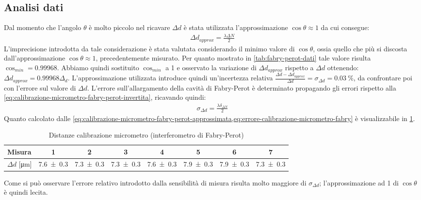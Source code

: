 \documentclass[a4paper]{article}
\begin{document}
\subsection{Analisi dati}
Dal momento che l'angolo $\theta$ è molto piccolo nel ricavare $\Delta d$ è stata utilizzata l'approssimazione $\cos{\theta}\approx1$ da cui consegue:
\begin{align}
    \Delta d_{approx} = \frac{\lambda \Delta N}{2}
\label{eq:calibrazione-micrometro-fabry-perot-approssimata}
\end{align}
L'imprecisione introdotta da tale considerazione è stata valutata considerando il minimo valore di $\cos{\theta}$, ossia quello che più si discosta dall'approssimazione $\cos{\theta}\approx1$, precedentemente misurato. Per quanto mostrato in \cref{tab:fabry-perot-dati} tale valore risulta $\cos_{min}=\num{0.99968}$.
Abbiamo quindi sostituito $\cos_{min}$ a 1 e osservato la variazione di $\Delta d_{approx}$ rispetto a $\Delta d$ ottenendo: $\Delta d_{approx} = \num{0.99968}\Delta_d$. L'approssimazione utilizzata introduce quindi un'incertezza relativa $\frac{\Delta d- \Delta d_{approx}}{\Delta d}=\sigma_{\Delta d}=\SI{0.03}{\percent}$, da confrontare poi con l'errore sul valore di $\Delta d$.
L'errore sull'allargamento della cavità di Fabry-Perot è determinato propagando gli errori rispetto alla \cref{eq:calibrazione-micrometro-fabry-perot-invertita}, ricavando quindi:
\begin{align}
   \sigma_{\Delta d}= \frac{\lambda \delta_{\Delta N}}{2}
\label{eq:errore-calibrazione-micrometro-fabry}
\end{align}
Quanto calcolato dalle \cref{eq:calibrazione-micrometro-fabry-perot-approssimata,eq:errore-calibrazione-micrometro-fabry} è visualizzabile in \cref{tab:distanze-calibrazione-fabry-perot}.
\begin{table}[htbp]
\centering
\caption{Distanze calibrazione micrometro (interferometro di Fabry-Perot)}
\begin{tabular}{|l|ccccccc|}
\hline
Misura & 1 & 2 & 3 & 4 & 5 & 6 & 7 \\\hline\hline
$\Delta d$ [\si{\micro\meter}] & \num{7.6 \pm 0.3}  & \num{7.3 \pm 0.3}  & \num{7.3 \pm 0.3}  & \num{7.6 \pm 0.3}  & \num{7.9 \pm 0.3} & \num{7.9 \pm 0.3} & \num{7.3 \pm 0.3} \\\hline
\end{tabular}
\label{tab:distanze-calibrazione-fabry-perot}
\end{table}
Come si può osservare l'errore relativo introdotto dalla sensibilità di misura risulta molto maggiore di $\sigma_{\Delta d}$; l'approssimazione ad 1 di $\cos{\theta}$ è quindi lecita.
\end{document}
